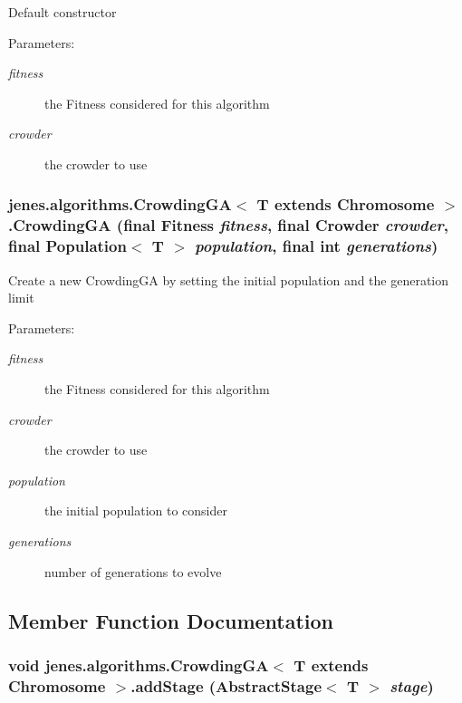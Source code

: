 Default constructor \begin{Desc}
\item[Parameters:]
\begin{description}
\item[{\em fitness}]the Fitness considered for this algorithm \item[{\em crowder}]the crowder to use \end{description}
\end{Desc}
\hypertarget{classjenes_1_1algorithms_1_1_crowding_g_a_3_01_t_01extends_01_chromosome_01_4_d3e5e26f962e7839e076b61efcd5704f}{
\subsubsection[CrowdingGA]{\setlength{\rightskip}{0pt plus 5cm}jenes.algorithms.CrowdingGA$<$ T extends Chromosome $>$.CrowdingGA (final Fitness {\em fitness}, \/  final Crowder {\em crowder}, \/  final Population$<$ T $>$ {\em population}, \/  final int {\em generations})}}
\label{classjenes_1_1algorithms_1_1_crowding_g_a_3_01_t_01extends_01_chromosome_01_4_d3e5e26f962e7839e076b61efcd5704f}


Create a new CrowdingGA by setting the initial population and the generation limit \begin{Desc}
\item[Parameters:]
\begin{description}
\item[{\em fitness}]the Fitness considered for this algorithm \item[{\em crowder}]the crowder to use \item[{\em population}]the initial population to consider \item[{\em generations}]number of generations to evolve \end{description}
\end{Desc}


\subsection{Member Function Documentation}
\hypertarget{classjenes_1_1algorithms_1_1_crowding_g_a_3_01_t_01extends_01_chromosome_01_4_d241412becfe0073cbeb06418a1e49f3}{
\subsubsection[addStage]{\setlength{\rightskip}{0pt plus 5cm}void jenes.algorithms.CrowdingGA$<$ T extends Chromosome $>$.addStage (AbstractStage$<$ T $>$ {\em stage})}}
\label{classjenes_1_1algorithms_1_1_crowding_g_a_3_01_t_01extends_01_chromosome_01_4_d241412becfe0073cbeb06418a1e49f3}


